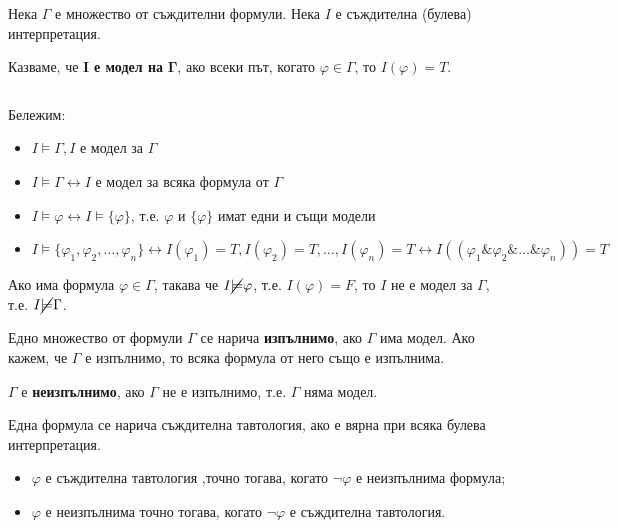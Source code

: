 \documentclass{article}
\begin{document}
\begin{mydef}
Нека $\Gamma$ е множество от съждителни формули. Нека $I$ е съждителна (булева) интерпретация. 

Казваме, че $\bm{I}$ \textbf{е модел на} $\bm{\Gamma}$, ако всеки път, когато $\varphi \in \Gamma$, то $I(\varphi) = T$.

$\ $
\par Бележим:
\begin{itemize}
\item $I \models \Gamma, I$ е модел за $\Gamma$
\item $I \models \Gamma \longleftrightarrow I$ е модел за всяка формула от $\Gamma$
\item $I \models \varphi \longleftrightarrow I \models \{\varphi\}$, т.е. $\varphi$ и $\{\varphi\}$ имат едни и същи модели
\item $I \models \{\varphi_1, \varphi_2, \ldots, \varphi_n\} \leftrightarrow I(\varphi_1) = T, I(\varphi_2) = T, \ldots, I(\varphi_n) = T \leftrightarrow I((\varphi_1\&\varphi_2\&\ldots\&\varphi_n)) = T$
\end{itemize}

\begin{remark}
Ако има формула $\varphi \in \Gamma$, такава че $I \cancel{\models} \varphi$, т.е. $I(\varphi) = F$, то $I$ не е модел за $\Gamma$, т.е. $I \cancel{\models} \Gamma$.
\end{remark}

\end{mydef}


\begin{mydef}
Едно множество от формули $\Gamma$ се нарича \textbf{изпълнимо}, ако $\Gamma$ има модел. Ако кажем, че $\Gamma$ е изпълнимо, то всяка формула от него също е изпълнима. 

$\Gamma$ е \textbf{неизпълнимо}, ако $\Gamma$ не е изпълнимо, т.е. $\Gamma$ няма модел.
\end{mydef}

\begin{mydef}
Една формула се нарича съждителна тавтология, ако е вярна при всяка булева интерпретация.
\begin{itemize}
\item $\varphi$ е съждителна тавтология ,точно тогава, когато $\neg\varphi$ е неизпълнима формула;
\item $\varphi$ е неизпълнима точно тогава, когато $\neg\varphi$ е съждителна тавтология.
\end{itemize}
\end{mydef}
\end{document}

